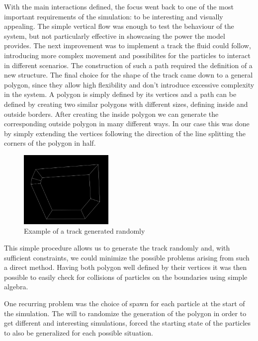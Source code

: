 \documentclass[]{usiinfbachelorproject}
\begin{document}
With the main interactions defined, the focus went back to one of the most important requirements of the 
simulation: to be interesting and visually appealing. The simple vertical flow was enough to test the behaviour 
of the system, but not particularly effective in showcasing the power the model provides. The next improvement was 
to implement a track the fluid could follow, introducing more complex movement and possibilites for the particles to 
interact in different scenarios. The construction of such a path required the definition of a new structure. The final choice 
for the shape of the track came down to a general polygon, since they allow high flexibility and don't introduce 
excessive complexity in the system. A polygon is simply defined by its vertices and a path can be defined by creating 
two similar polygons with different sizes, defining inside and outside borders. After creating the inside polygon we can 
generate the corresponding outside polygon in many different ways. In our case this was done by simply extending the vertices following 
the direction of the line splitting the corners of the polygon in half. 

\begin{figure} [ht]
  \centering
  \includegraphics[width=0.4\textwidth]{polygon.png}
  \caption{Example of a track generated randomly}
  \label{fig:Polygon}
\end{figure}

This simple procedure allows us to generate the track randomly and, with sufficient constraints, we could minimize the possible 
problems arising from such a direct method. Having both polygon well defined by their vertices it was 
then possible to easily check for collisions of particles on the boundaries using simple algebra.

One recurring problem was the choice of spawn for each particle at the start of the simulation. The will to randomize the 
generation of the polygon in order to get different and interesting simulations, forced the starting state of the particles 
to also be generalized for each possible situation.
\end{document}
